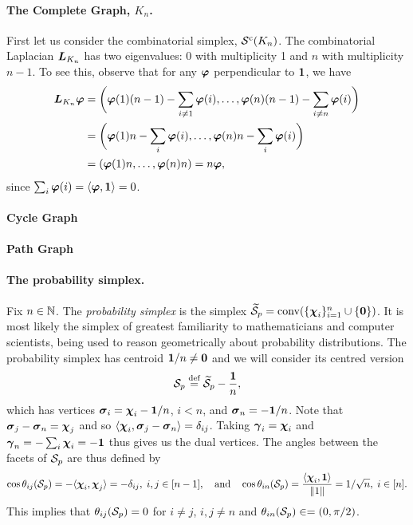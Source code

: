 
\paragraph{The Complete Graph, $K_n$.}
First let us consider the combinatorial simplex, $\mathcal{S}^{\textnormal{c}}(K_n)$.  The combinatorial Laplacian $\vb*{L}_{K_n}$ has two eigenvalues: 0 with multiplicity 1 and $n$ with multiplicity $n-1$. To see this, observe that for any $\vb*{\varphi}$ perpendicular to $\vb{1}$, we have 
\begin{align*}
\vb*{L}_{K_n}\vb*{\varphi} &= \bigg(\vb*{\varphi}(1)(n-1)-\sum_{i\neq 1}\vb*{\varphi}(i),\dots,\vb*{\varphi}(n)(n-1)-\sum_{i\neq n}\vb*{\varphi}(i)\bigg) \\
&= \bigg(\vb*{\varphi}(1)n - \sum_i \vb*{\varphi}(i), \dots,\vb*{\varphi}(n)n - \sum_i \vb*{\varphi}(i)\bigg) \\
&= (\vb*{\varphi}(1)n,\dots,\vb*{\varphi}(n)n) = n\vb*{\varphi},
\end{align*}
since $\sum_i\vb*{\varphi}(i)=\langle \vb*{\varphi},\vb{1}\rangle =0$. 

\paragraph{Cycle Graph}

\paragraph{Path Graph}

\paragraph{The probability simplex.} 
Fix  $n\in\mathbb{N}$. The \emph{probability simplex} is the simplex $\widetilde{\mathcal{S}}_p=\textnormal{conv}(\{\boldsymbol{\chi}_i\}_{i=1}^n \cup \{\vb{0}\})$. It is most likely the simplex of greatest familiarity to mathematicians and computer scientists, being used to reason geometrically about probability distributions. The probability simplex has centroid $\vb{1}/n\neq\vb{0}$ and we will consider its centred version 
\[\mathcal{S}_p \overset{\text{def}}{=} \widetilde{\mathcal{S}}_p -  \frac{\vb{1}}{n},\]
which has vertices  $\vb*{\sigma}_i = \boldsymbol{\chi}_i - \vb{1}/n$, $i<n$, and $\vb*{\sigma}_n = -\vb{1}/n$. Note that $\vb*{\sigma}_j-\vb*{\sigma}_n = \boldsymbol{\chi}_j$ and so 
$\langle \boldsymbol{\chi}_i, \vb*{\sigma}_j-\vb*{\sigma}_n\rangle = \delta_{ij}$. Taking  $\vb*{\gamma}_i = \boldsymbol{\chi}_i$ and $\vb*{\gamma}_n = -\sum_i \boldsymbol{\chi}_i = -\vb{1}$ thus gives us the dual vertices. The  angles between the facets of $\mathcal{S}_p$ are thus defined by 
\begin{equation*}
\cos\theta_{ij}(\mathcal{S}_p) = - \langle \boldsymbol{\chi}_i,\boldsymbol{\chi}_j\rangle = -\delta_{ij}, \; i,j\in[n-1],  \quad \text{and}\quad \cos\theta_{in}(\mathcal{S}_p) = \frac{\langle \boldsymbol{\chi}_i,\vb{1}\rangle}{\norm{1}} = 1/\sqrt{n}, \;i\in[n].
\end{equation*}
This implies  that $\theta_{ij}(\mathcal{S}_p) = 0$ for $i\neq j$, $i,j\neq n$ and $\theta_{in}(\mathcal{S}_p) \in =(0,\pi/2)$. 

